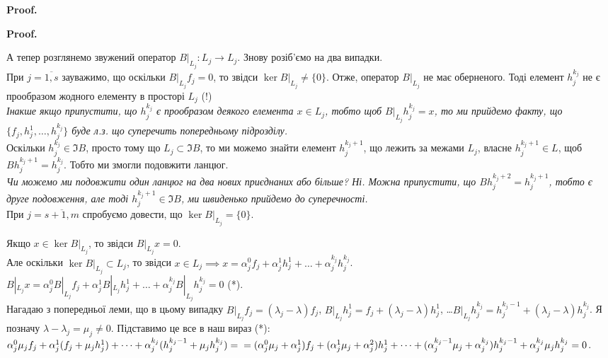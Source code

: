 \documentclass[a4paper, 10pt]{article}
\makeatletter
\theoremstyle{theoremdd}
\renewenvironment{proof}[1][Proof.\\]{\par
\pushQED{\hfill \qed}%
\normalfont \topsep6\p@\@plus6\p@\relax
\trivlist
\item\relax
{\bfseries
#1\@addpunct{.}}\hspace\labelsep\ignorespaces
}{%
\popQED\endtrivlist\@endpefalse
}
\makeatother
\begin{document}
\begin{proof}
\begin{proof}
А тепер розглянемо звужений оператор $B|_{L_j}: L_j \to L_j$. Знову розіб'ємо на два випадки.\\
При $j=\overline{1,s}$ зауважимо, що оскільки $B|_{L_j}f_j = 0$, то звідси $\ker B|_{L_j} \neq \{0\}$. Отже, оператор $B|_{L_j}$ не має оберненого. Тоді елемент $h_j^{k_j}$ не є прообразом жодного елементу в просторі $L_j$ (!)\\
\textit{Інакше якщо припустити, що $h_j^{k_j}$ є прообразом деякого елемента $x \in L_j$, тобто щоб $B|_{L_j}h_j^{k_j} = x$, то ми прийдемо факту, що $\{f_j,h_j^1,\dots,h_j^{k_j}\}$ буде л.з. що суперечить попередньому підрозділу.}\\
Оскільки $h_j^{k_j} \in \Im B$, просто тому що $L_j \subset \Im B$, то ми можемо знайти елемент $h_j^{k_j+1}$, що лежить за межами $L_j$, власне $h_j^{k_j+1} \in L$, щоб $Bh_j^{k_j+1} = h_j^{k_j}$. Тобто ми змогли подовжити ланцюг.\\
\textit{Чи можемо ми подовжити один ланцюг на два нових приєднаних або більше? Ні. Можна припустити, що $Bh_j^{k_j+2} = h_j^{k_j+1}$, тобто є друге подовження, але тоді $h_j^{k_j+1} \in \Im B$, ми швиденько прийдемо до суперечності.}
\bigskip \\
При $j=\overline{s+1,m}$ спробуємо довести, що $\ker B|_{L_j} = \{0\}$.
\iffalse
$x \in \ker B|{L_j} \implies B|_{L_j} x = 0 \implies Bx = 0 \implies Ax = \lambda x$, тобто $x$ - власний вектор для числа $\lambda$. А оскільки $L_j$ не містить власних векторів для $\lambda$, то звідси $x = 0$.\\
Це означає, що існує $(B|_{L_j})^{-1}$. А тому будь-який елемент $L_j$ при дії $B|_{L_j}$ має прообраз з $L_j$. А це означає, що $h_{s+1}^{k_{s+1}},\dots,h_m^{k_m}$ не мають продовження за межами $L_{s+1},\dots,L_m$.
\fi
Якщо $x \in \ker B|_{L_j}$, то звідси $B|_{L_j}x = 0$.\\
Але оскільки $\ker B|_{L_j} \subset L_j$, то звідси $x \in L_j \implies x = \alpha_j^0 f_j + \alpha_j^1 h_j^1 + \dots + \alpha_j^{k_j}h_j^{k_j}$.\\
$B|_{L_j}x = \alpha_j^0 B|_{L_j}f_j + \alpha_j^1 B|_{L_j}h_j^1 + \dots + \alpha_j^{k_j} B|_{L_j}h_j^{k_j} = 0$ (*).\\
Нагадаю з попередньої леми, що в цьому випадку $B|_{L_j}f_j = (\lambda_j-\lambda)f_j$, $B|_{L_j}h_j^1 = f_j + (\lambda_j - \lambda)h_j^1$, \dots $B|_{L_j}h_j^{k_j} = h_j^{k_j-1} + (\lambda_j - \lambda)h_j^{k_j}$. Я позначу $\lambda-\lambda_j = \mu_j \neq 0$. Підставимо це все в наш вираз (*):
$\alpha_j^0 \mu_j f_j + \alpha_j^1 (f_j+\mu_j h_j^1) + \dots + \alpha_j^{k_j} (h_j^{k_j-1}+\mu_j h_j^{k_j}) = \\ =(\alpha_j^0 \mu_j + \alpha_j^1) f_j + (\alpha_j^1 \mu_j + \alpha_j^2) h_j^1 + \dots + (\alpha_j^{k_j-1}\mu_j + \alpha_j^{k_j})h_j^{k_j-1} + \alpha_j^{k_j} \mu_j h_j^{k_j} = 0$.\\

\end{proof}
\end{proof}
\end{document}

